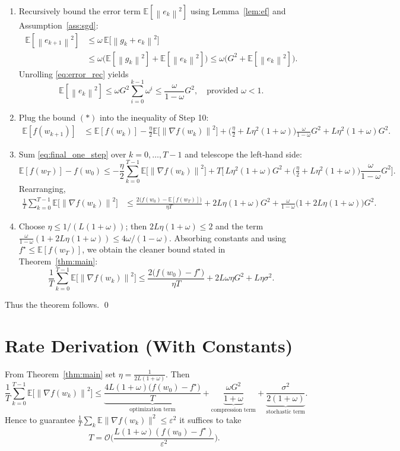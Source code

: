 \documentclass{article}
\newcommand{\E}{\mathbb{E}}
\newcommand{\norm}[1]{\left\|#1\right\|}
\begin{document}
\begin{enumerate}
\item[Step 11.] Recursively bound the error term $\E[\norm{e_k}^{2}]$ using Lemma~\ref{lem:ef} and Assumption~\ref{ass:sgd}:
\begin{align}
\E[\norm{e_{k+1}}^{2}]
&\le \omega\,\E\!\big[\norm{g_k+e_k}^{2}\big] \nonumber\\
&\le \omega\big(\E[\norm{g_k}^{2}]+\E[\norm{e_k}^{2}]\big)
\le \omega\big(G^{2}+\E[\norm{e_k}^{2}]\big). \label{eq:error_rec}
\end{align}
Unrolling \eqref{eq:error_rec} yields
\[
\E[\norm{e_k}^{2}]
\le \omega G^{2}\sum_{i=0}^{k-1}\omega^{i}
\le \frac{\omega}{1-\omega}G^{2},
\quad\text{provided }\omega<1.
\tag{*}
\]

\item[Step 12.] Plug the bound \((*)\) into the inequality of Step 10:
\begin{align}
\E[f(w_{k+1})]
&\le \E[f(w_k)]-\frac{\eta}{2}\E\!\big[\norm{\nabla f(w_k)}^{2}\big]
   +\Big(\tfrac{\eta}{2}+L\eta^{2}(1+\omega)\Big)\frac{\omega}{1-\omega}G^{2}
   +L\eta^{2}(1+\omega)G^{2}. \label{eq:final_one_step}
\end{align}
\item[Step 13.] Sum \eqref{eq:final_one_step} over $k=0,\dots,T-1$ and telescope the left‑hand side:
\[
\E[f(w_T)]-f(w_0)
\le -\frac{\eta}{2}\sum_{k=0}^{T-1}\E\!\big[\norm{\nabla f(w_k)}^{2}\big]
   +T\Big[\,L\eta^{2}(1+\omega)G^{2}
          +\Big(\tfrac{\eta}{2}+L\eta^{2}(1+\omega)\Big)\frac{\omega}{1-\omega}G^{2}\Big].
\]
Rearranging,
\begin{align}
\frac{1}{T}\sum_{k=0}^{T-1}\E\!\big[\norm{\nabla f(w_k)}^{2}\big]
&\le \frac{2\big(f(w_0)-\E[f(w_T)]\big)}{\eta T}
   +2L\eta(1+\omega)G^{2}
   +\frac{\omega}{1-\omega}\Big(1+2L\eta(1+\omega)\Big)G^{2}. \label{eq:pre_rate}
\end{align}
\item[Step 14.] Choose $\eta\le 1/(L(1+\omega))$; then $2L\eta(1+\omega)\le 2$ and the term $\frac{\omega}{1-\omega}(1+2L\eta(1+\omega))\le 4\omega/(1-\omega)$. Absorbing constants and using $f^\star\le \E[f(w_T)]$, we obtain the cleaner bound stated in Theorem~\ref{thm:main}:
\[
\frac{1}{T}\sum_{k=0}^{T-1}\E\!\big[\norm{\nabla f(w_k)}^{2}\big]
\le \frac{2\big(f(w_0)-f^\star\big)}{\eta T}
   +2L\omega\eta G^{2}
   +L\eta\sigma^{2}.
\]
\end{enumerate}
Thus the theorem follows. \qed

\section*{Rate Derivation (With Constants)}
From Theorem~\ref{thm:main} set $\eta = \frac{1}{2L(1+\omega)}$. Then
\[
\frac{1}{T}\sum_{k=0}^{T-1}\E\!\big[\norm{\nabla f(w_k)}^{2}\big]
\le \underbrace{\frac{4L(1+\omega)\big(f(w_0)-f^\star\big)}{T}}_{\text{optimization term}}
   +\underbrace{\frac{\omega G^{2}}{1+\omega}}_{\text{compression term}}
   +\underbrace{\frac{\sigma^{2}}{2(1+\omega)}}_{\text{stochastic term}} .
\]
Hence to guarantee $\frac{1}{T}\sum_{k}\E\|\nabla f(w_k)\|^{2}\le\varepsilon^{2}$ it suffices to take
\[
T = \mathcal{O}\!\Big(\frac{L(1+\omega)(f(w_0)-f^\star)}{\varepsilon^{2}}\Big).
\]
\end{document}
